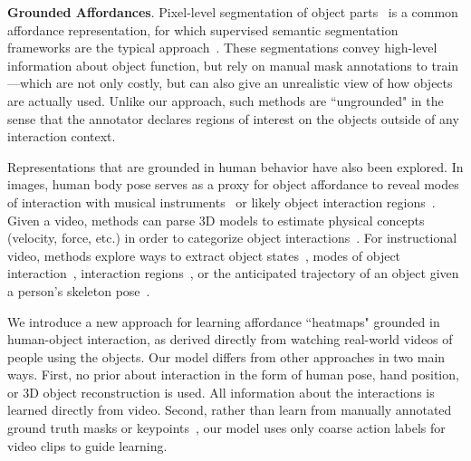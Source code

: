 \documentclass[10pt,twocolumn,letterpaper]{article}
\begin{document}
\vspace{0.05in}
\noindent\textbf{Grounded Affordances}.
Pixel-level segmentation of object parts~\cite{sawatzky2017weakly,myers2015affordance,nguyen2017object} is a common affordance representation, for which 
supervised semantic segmentation frameworks are the typical approach~\cite{myers2015affordance,roy2016multi,nguyen2017object,do2017affordancenet}. These segmentations convey high-level information about object function, but rely on manual mask annotations to train---which are not only costly, but can also give an unrealistic view of how objects are actually used.  Unlike our approach, such methods are ``ungrounded" in the sense that the annotator declares regions of interest on the objects outside of any interaction context.


Representations that are grounded in human behavior have also been explored. In images, human body pose serves as a proxy for object affordance to reveal 
modes of interaction with musical instruments~\cite{yao2010grouplet,yao2013discovering} or likely object interaction regions~\cite{chaoyeh-ijcv2016}.  
Given a video, methods can parse 3D models 
to estimate physical concepts (velocity, force, etc.) in order to categorize object interactions~\cite{zhu2016inferring,zhu2015understanding}.  For instructional video, methods explore ways to extract object states~\cite{alayrac2017joint}, modes of object interaction~\cite{damen2014you}, interaction regions~\cite{fang2018demo2vec}, or the anticipated trajectory of an object given a person's skeleton pose~\cite{koppula2014physically}. 

We introduce a new approach for learning affordance ``heatmaps" grounded in human-object interaction, as
derived directly from watching real-world videos of people using the objects.
Our model differs from other approaches in two main ways. First, no prior about interaction in the form of human pose, hand position, or 3D object reconstruction is used. All information about the interactions is learned directly from video. Second, rather than learn from manually annotated ground truth masks or keypoints~\cite{myers2015affordance,roy2016multi,nguyen2017object,do2017affordancenet,sawatzky2017weakly,sawatzky2017adaptive,fang2018demo2vec}, 
our model uses only coarse action labels for video clips to guide learning.
\end{document}
